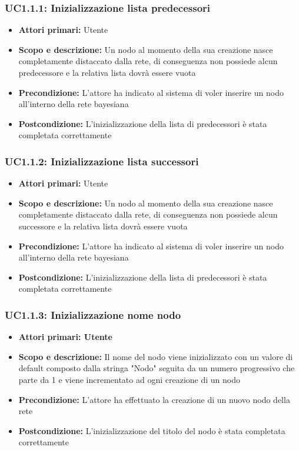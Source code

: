 \subsubsection{UC1.1.1: Inizializzazione lista predecessori} 
\begin{itemize} 
	\item{\textbf{Attori primari:} Utente} 
	\item{\textbf{Scopo e descrizione:} Un nodo al momento della sua creazione nasce completamente distaccato dalla rete, di conseguenza non possiede alcun predecessore e la relativa lista dovrà essere vuota} 
	\item{\textbf{Precondizione:} L'attore ha indicato al sistema di voler inserire un nodo all'interno della rete bayesiana} 
	\item{\textbf{Postcondizione:} L'inizializzazione della lista di predecessori è stata completata correttamente} 
\end{itemize} 
\subsubsection{UC1.1.2: Inizializzazione lista successori} 
\begin{itemize} 
	\item{\textbf{Attori primari:} Utente} 
	\item{\textbf{Scopo e descrizione:} Un nodo al momento della sua creazione nasce completamente distaccato dalla rete, di conseguenza non possiede alcun successore e la relativa lista dovrà essere vuota} 
	\item{\textbf{Precondizione:} L'attore ha indicato al sistema di voler inserire un nodo all'interno della rete bayesiana} 
	\item{\textbf{Postcondizione:} L'inizializzazione della lista di predecessori è stata completata correttamente} 
\end{itemize} 
\subsubsection{UC1.1.3: Inizializzazione nome nodo} 
\begin{itemize} 
	\item{\textbf{Attori primari: Utente} } 
	\item{\textbf{Scopo e descrizione:} Il nome del nodo viene inizializzato con un valore di default composto dalla stringa "Nodo" seguita da un numero progressivo che parte da 1 e viene incrementato ad ogni creazione di un nodo} 
	\item{\textbf{Precondizione:} L'attore ha effettuato la creazione di un nuovo nodo della rete} 
	\item{\textbf{Postcondizione:} L'inizializzazione del titolo del nodo è stata completata correttamente} 
\end{itemize} 

